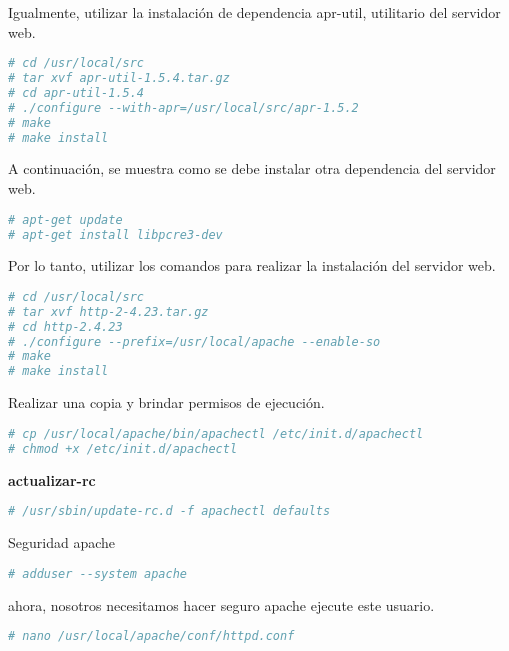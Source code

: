 Igualmente, utilizar la instalación de dependencia apr-util, utilitario del
servidor web.

\begin{lstlisting}[language=bash, caption={Instalación dependencias utilitarios para servidor web}]
# cd /usr/local/src
# tar xvf apr-util-1.5.4.tar.gz
# cd apr-util-1.5.4
# ./configure --with-apr=/usr/local/src/apr-1.5.2
# make
# make install
\end{lstlisting}

A continuación, se muestra como se debe instalar otra dependencia del servidor
web.

\begin{lstlisting}[language=bash, caption={Instalación de otra dependencia del servidor web}]
# apt-get update
# apt-get install libpcre3-dev
\end{lstlisting}

Por lo tanto, utilizar los comandos para realizar la instalación del servidor web.

\begin{lstlisting}[language=bash, caption={Instalación de un servidor web}]
# cd /usr/local/src
# tar xvf http-2-4.23.tar.gz
# cd http-2.4.23
# ./configure --prefix=/usr/local/apache --enable-so 
# make
# make install
\end{lstlisting}

Realizar una copia y brindar permisos de ejecución.

\begin{lstlisting}[language=bash, caption={Comandos para agregar como demonio}]
# cp /usr/local/apache/bin/apachectl /etc/init.d/apachectl
# chmod +x /etc/init.d/apachectl
\end{lstlisting}

\textbf{actualizar-rc}

\begin{lstlisting}[language=bash, caption={}]
# /usr/sbin/update-rc.d -f apachectl defaults
\end{lstlisting}

Seguridad apache

\begin{lstlisting}[language=bash, caption={}]
# adduser --system apache
\end{lstlisting}

ahora, nosotros necesitamos hacer seguro apache ejecute este usuario.

\begin{lstlisting}[language=bash, caption={}]
# nano /usr/local/apache/conf/httpd.conf
\end{lstlisting}

